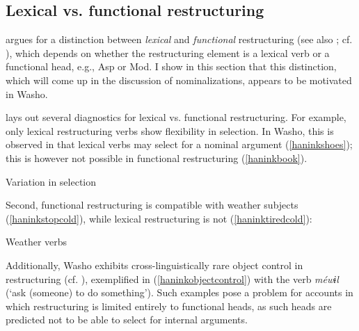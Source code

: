 \documentclass[output=paper]{langscibook}
\begin{document}
\subsection{Lexical vs. functional restructuring} \label{haninksec:vs}
\citet{wurmbrand2001} argues for a distinction between {\itshape lexical} and {\itshape functional} restructuring (see also \citealt{Wurmbrand2004}; cf. \citealt{cinque2001,cinque2004,grano2012diss}), which depends on  whether the restructuring element is a lexical verb or a functional head, e.g., Asp or Mod. I show in this section that this distinction, which will come up in the discussion of nominalizations, appears to be  motivated in Washo. 

\citet{Wurmbrand2004} lays out several diagnostics for lexical vs. functional restructuring. For example, only lexical restructuring verbs show flexibility in selection. In Washo, this is observed in that lexical verbs may select for a nominal argument (\ref{haninkshoes}); this is however not possible in functional restructuring (\ref{haninkbook}).

\ea Variation in selection
\z
\z

\begin{sloppypar}Second, functional restructuring is compatible with weather subjects (\ref{haninkstopcold}), while lexical restructuring is not (\ref{haninktiredcold}):\end{sloppypar}

\ea Weather verbs
\z
\z

Additionally, Washo exhibits cross-linguistically rare object control in restructuring (cf. \citealt{cinque2001}), exemplified in (\ref{haninkobjectcontrol}) with the verb {\itshape méwɨl} (`ask (someone) to do something'). Such examples pose a problem for accounts in which restructuring is limited entirely to functional heads, as such heads are predicted not to be able to select for internal arguments.
\end{document}
